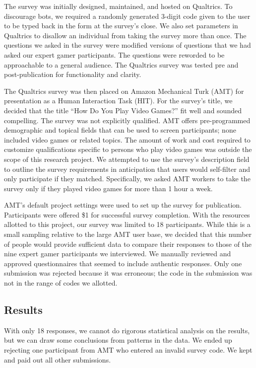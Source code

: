 \documentclass[11pt,manuscript,screen,review]{acmart} %
\begin{document}
The survey was initially designed, maintained, and hosted on Qualtrics. To discourage bots, we required a randomly generated 3-digit code given to the user to be typed back in the form at the survey’s close. We also set parameters in Qualtrics to disallow an individual from taking the survey more than once. The questions we asked in the survey were modified versions of questions that we had asked our expert gamer participants. The questions were reworded to be approachable to a general audience. The Qualtrics survey was tested pre and post-publication for functionality and clarity.

The Qualtrics survey was then placed on Amazon Mechanical Turk (AMT) for presentation as a Human Interaction Task (HIT). For the survey’s title, we decided that the title “How Do You Play Video Games?” fit well and sounded compelling. The survey was not explicitly qualified. AMT offers pre-programmed demographic and topical fields that can be used to screen participants; none included video games or related topics. The amount of work and cost required to customize qualifications specific to persons who play video games was outside the scope of this research project. We attempted to use the survey’s description field to outline the survey requirements in anticipation that users would self-filter and only participate if they matched. Specifically, we asked AMT workers to take the survey only if they played video games for more than 1 hour a week. 

AMT’s default project settings were used to set up the survey for publication. Participants were offered \$1 for successful survey completion. With the resources allotted to this project, our survey was limited to 18 participants. While this is a small sampling relative to the large AMT user base, we decided that this number of people would provide sufficient data to compare their responses to those of the nine expert gamer participants we interviewed. We manually reviewed and approved questionnaires that seemed to include authentic responses. Only one submission was rejected because it was erroneous; the code in the submission was not in the range of codes we allotted.

\subsection{Results}

With only 18 responses, we cannot do rigorous statistical analysis on the results, but we can draw some conclusions from patterns in the data. We ended up rejecting one participant from AMT who entered an invalid survey code. We kept and paid out all other submissions.
\end{document}
